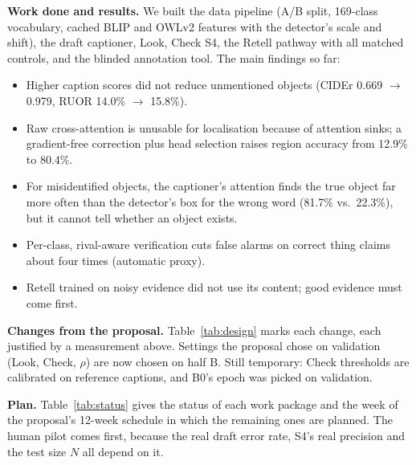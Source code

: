 \documentclass[conference]{IEEEtran}
\begin{document}
\textbf{Work done and results.} We built the data pipeline (A/B split, 169-class vocabulary, cached BLIP and
OWLv2 features with the detector's scale and shift), the draft captioner, Look, Check S4, the Retell pathway
with all matched controls, and the blinded annotation tool. The main findings so far:
\begin{itemize}
\item Higher caption scores did not reduce unmentioned objects (CIDEr 0.669 $\to$ 0.979, RUOR 14.0\% $\to$
15.8\%).
\item Raw cross-attention is unusable for localisation because of attention sinks; a gradient-free correction
plus head selection raises region accuracy from 12.9\% to 80.4\%.
\item For misidentified objects, the captioner's attention finds the true object far more often than the
detector's box for the wrong word (81.7\% vs.\ 22.3\%), but it cannot tell whether an object exists.
\item Per-class, rival-aware verification cuts false alarms on correct thing claims about four times
(automatic proxy).
\item Retell trained on noisy evidence did not use its content; good evidence must come first.
\end{itemize}

\textbf{Changes from the proposal.} Table~\ref{tab:design} marks each change, each justified by a measurement
above. Settings the proposal chose on validation (Look, Check, $\rho$) are now chosen on half B. Still
temporary: Check thresholds are calibrated on reference captions, and B0's epoch was picked on validation.

\textbf{Plan.} Table~\ref{tab:status} gives the status of each work package and the week of the proposal's
12-week schedule in which the remaining ones are planned. The human pilot comes first, because the real draft
error rate, S4's real precision and the test size $N$ all depend on it.
\end{document}

